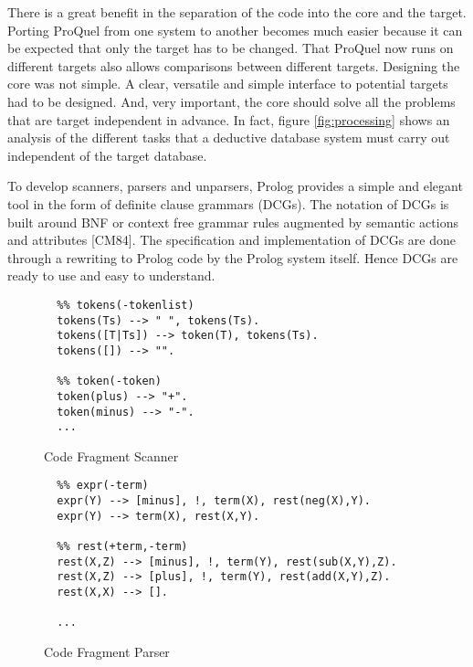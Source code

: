 There is a great benefit in the separation of the code into the core and the target. Porting
ProQuel from one system to another becomes much easier because it can be expected that only the
target has to be changed. That ProQuel now runs on different targets also allows comparisons between
different targets. Designing the core was not simple. A clear, versatile and simple interface 
to potential targets had to be designed. And, very important, the core should solve all the 
problems that are target independent in advance. In fact, figure \ref{fig:processing} shows an 
analysis of the different tasks that a deductive database system must carry out independent 
of the target database.

\label{secdcg}
To develop scanners, parsers and unparsers, Prolog provides a simple and elegant tool in the 
form of definite clause grammars (DCGs). The notation of DCGs is built around BNF or context
free grammar rules augmented by semantic actions and attributes [CM84]. The specification 
and implementation of DCGs are done through a rewriting to Prolog code by the Prolog system 
itself. Hence DCGs are ready to use and easy to understand.

\begin{figure}
{\small
\begin{verbatim}
  %% tokens(-tokenlist)
  tokens(Ts) --> " ", tokens(Ts).
  tokens([T|Ts]) --> token(T), tokens(Ts).
  tokens([]) --> "".

  %% token(-token)
  token(plus) --> "+".
  token(minus) --> "-".
  ...
\end{verbatim}
}
\caption{Code Fragment Scanner}
\label{prgscan}
\end{figure}

\begin{figure}
{\small
\begin{verbatim}
  %% expr(-term)
  expr(Y) --> [minus], !, term(X), rest(neg(X),Y).
  expr(Y) --> term(X), rest(X,Y).

  %% rest(+term,-term)
  rest(X,Z) --> [minus], !, term(Y), rest(sub(X,Y),Z).
  rest(X,Z) --> [plus], !, term(Y), rest(add(X,Y),Z).
  rest(X,X) --> [].

  ...
\end{verbatim}
}
\caption{Code Fragment Parser}
\label{prgpars}
\end{figure}


